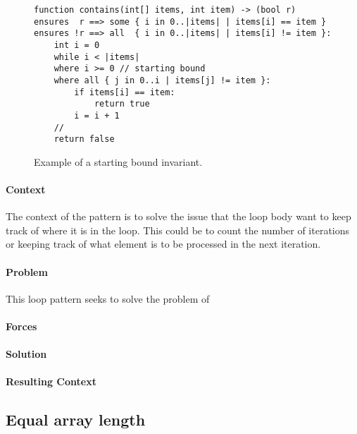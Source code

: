 \begin{figure}[ht]
\begin{lstlisting}
function contains(int[] items, int item) -> (bool r)
ensures  r ==> some { i in 0..|items| | items[i] == item }
ensures !r ==> all  { i in 0..|items| | items[i] != item }:
    int i = 0
    while i < |items|
    where i >= 0 // starting bound
    where all { j in 0..i | items[j] != item }:
        if items[i] == item:
            return true
        i = i + 1
    //
    return false
\end{lstlisting}
\caption{Example of a starting bound invariant.}
\label{lst:starting-bound-contains}
\end{figure}


\paragraph{Context} 

The context of the pattern is to solve the issue that the loop 
body want to keep track of where it is in the loop.
This could be to count the number of iterations or keeping track
of what element is to be processed in the next iteration.

\paragraph{Problem}

This loop pattern seeks to solve the problem of 

\paragraph{Forces}

\paragraph{Solution}

\paragraph{Resulting Context}


\subsection{Equal array length}

